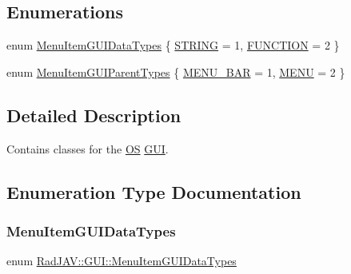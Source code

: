 \subsection*{Enumerations}
\begin{DoxyCompactItemize}
\item 
enum \mbox{\hyperlink{namespace_rad_j_a_v_1_1_g_u_i_a35669d4ce974e552cc63a546edfcf1e9}{Menu\+Item\+G\+U\+I\+Data\+Types}} \{ \mbox{\hyperlink{namespace_rad_j_a_v_1_1_g_u_i_a35669d4ce974e552cc63a546edfcf1e9a37cef398eb125ec4db83e4edc6cd7195}{S\+T\+R\+I\+NG}} = 1, 
\mbox{\hyperlink{namespace_rad_j_a_v_1_1_g_u_i_a35669d4ce974e552cc63a546edfcf1e9ac930b4539555274f1eb4095afb00bfc7}{F\+U\+N\+C\+T\+I\+ON}} = 2
 \}
\item 
enum \mbox{\hyperlink{namespace_rad_j_a_v_1_1_g_u_i_a9cbdda386de15d1c382ddeadbaec131f}{Menu\+Item\+G\+U\+I\+Parent\+Types}} \{ \mbox{\hyperlink{namespace_rad_j_a_v_1_1_g_u_i_a9cbdda386de15d1c382ddeadbaec131facf4813a08c983ecb7a7587bb1242064c}{M\+E\+N\+U\+\_\+\+B\+AR}} = 1, 
\mbox{\hyperlink{namespace_rad_j_a_v_1_1_g_u_i_a9cbdda386de15d1c382ddeadbaec131fa0a03134c0289889423cba200d27337ae}{M\+E\+NU}} = 2
 \}
\end{DoxyCompactItemize}


\subsection{Detailed Description}
Contains classes for the \mbox{\hyperlink{class_rad_j_a_v_1_1_o_s}{OS}} \mbox{\hyperlink{namespace_rad_j_a_v_1_1_g_u_i}{G\+UI}}. 

\subsection{Enumeration Type Documentation}
\mbox{\label{namespace_rad_j_a_v_1_1_g_u_i_a35669d4ce974e552cc63a546edfcf1e9}} 
\subsubsection{\texorpdfstring{Menu\+Item\+G\+U\+I\+Data\+Types}{MenuItemGUIDataTypes}}
{\footnotesize\ttfamily enum \mbox{\hyperlink{namespace_rad_j_a_v_1_1_g_u_i_a35669d4ce974e552cc63a546edfcf1e9}{Rad\+J\+A\+V\+::\+G\+U\+I\+::\+Menu\+Item\+G\+U\+I\+Data\+Types}}}

